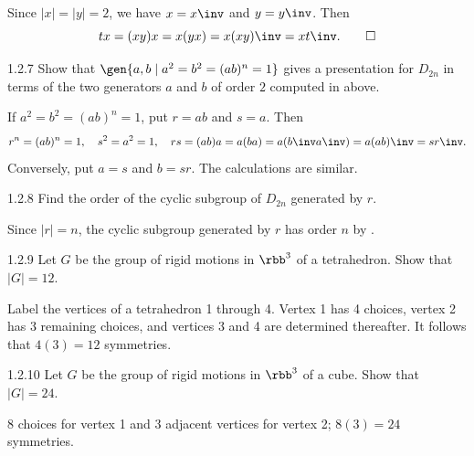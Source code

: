 \begin{sol}
    Since $|x| = |y| = 2$, we have $x = x\inv$ and $y = y\inv$.
	Then
    \[
    	tx = (xy)x = x(yx) = x(xy)\inv = x t\inv. \qedhere
    \]
\end{sol}

\begin{exercise}{1.2.7}
    Show that $\gen{a, b \mid a^2 = b^2 = (ab)^n = 1}$ gives a presentation for $D_{2n}$ in terms of the two generators $a$ and $b$ of order $2$ computed in  above.
    
\end{exercise}

\begin{sol}
    If $a^2 = b^2 = (ab)^n = 1$, put $r = ab$ and $s = a$.
	Then
    \[
    	r^n = (ab)^n = 1, \quad s^2 = a^2 = 1, \quad rs = (ab)a = a(ba) = a(b\inv a\inv) = a(ab)\inv = sr\inv.
    \]
    Conversely, put $a = s$ and $b = sr$.
	The calculations are similar.
\end{sol}

\begin{exercise}{1.2.8}
    Find the order of the cyclic subgroup of $D_{2n}$ generated by $r$.
\end{exercise}

\begin{sol}
    Since $|r| = n$, the cyclic subgroup generated by $r$ has order $n$ by .
\end{sol}

\begin{exercise}{1.2.9} 
    Let $G$ be the group of rigid motions in $\rbb^3$ of a tetrahedron.
	Show that $|G| = 12$.
\end{exercise}

\begin{sol}
    Label the vertices of a tetrahedron 1 through 4.
	Vertex 1 has 4 choices, vertex 2 has 3 remaining choices, and vertices 3 and 4 are determined thereafter.
	It follows that $4(3) = 12$ symmetries.
\end{sol}

\begin{exercise}{1.2.10}
    Let $G$ be the group of rigid motions in $\rbb^3$ of a cube.
	Show that $|G| = 24$.
\end{exercise}

\begin{sol}
    8 choices for vertex 1 and 3 adjacent vertices for vertex 2; $8(3) = 24$ symmetries.
\end{sol}

